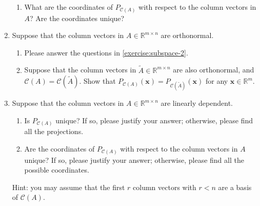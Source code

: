 \documentclass[11pt,letter,notitlepage]{article}
\begin{document}
\begin{exercise}
\begin{enumerate}
\begin{enumerate}
                    \item What are the coordinates of $P_{\mathcal{C}(A)}$ with respect to the column vectors in $A$? Are the coordinates unique?
                \end{enumerate}
            
            
        \item Suppose that the column vectors in $A\in\mathbb{R}^{m\times n}$ are orthonormal. 
            \begin{enumerate}
                \item Please answer the questions in \ref{exercise:subspace-2}.
                
                \item Suppose that the column vectors in $\widetilde{A}\in\mathbb{R}^{m\times n}$ are also orthonormal, and $\mathcal{C}(A)=\mathcal{C}(\widetilde{A})$. Show that $P_{\mathcal{C}(A)}(\mathbf{x})=P_{\mathcal{C}(\widetilde{A})}(\mathbf{x})$ for any $\mathbf{x}\in\mathbb{R}^m$.
            \end{enumerate}
            
        \item Suppose that the column vectors in $A\in\mathbb{R}^{m\times n}$ are linearly dependent.
            \begin{enumerate}
                \item Is $P_{\mathcal{C}(A)}$ unique? If so, please justify your answer; otherwise, please find all the projections.
                
                \item Are the coordinates of $P_{\mathcal{C}(A)}$ with respect to the column vectors in $A$ unique? If so, please justify your answer; otherwise, please find all the possible coordinates.
            \end{enumerate}
            Hint: you may assume that the first $r$ column vectors with $r<n$ are a basis of $\mathcal{C}(A)$.
    \end{enumerate}
\end{exercise}

\begin{solution}
	
\end{solution}

\newpage
\end{document}
